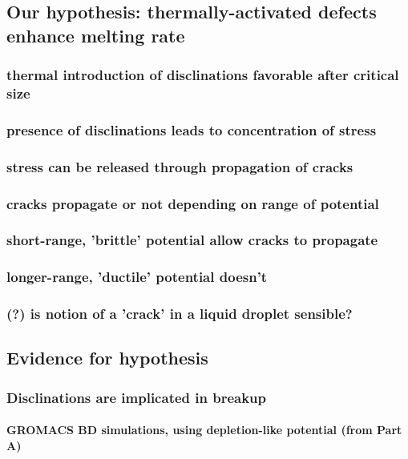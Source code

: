 \documentclass{umthesis}
\begin{document}
\subsection{Our hypothesis:  thermally-activated defects enhance melting rate}
\label{sec-2.1.3}
\subsubsection{thermal introduction of disclinations favorable after critical size}
\label{sec-2.1.3.1}
\subsubsection{presence of disclinations leads to concentration of stress}
\label{sec-2.1.3.2}
\subsubsection{stress can be released through propagation of cracks}
\label{sec-2.1.3.3}
\subsubsection{cracks propagate or not depending on range of potential}
\label{sec-2.1.3.4}
\subsubsection{short-range, 'brittle' potential allow cracks to propagate}
\label{sec-2.1.3.5}
\subsubsection{longer-range, 'ductile' potential doesn't}
\label{sec-2.1.3.6}
\subsubsection{(?) is notion of a 'crack' in a liquid droplet sensible?}
\label{sec-2.1.3.7}
\subsection{Evidence for hypothesis}
\label{sec-2.1.4}
\subsubsection{Disclinations are implicated in breakup}
\label{sec-2.1.4.1}
\paragraph{GROMACS BD simulations, using depletion-like potential (from Part A)}
\label{sec-2.1.4.1.1}
\end{document}
